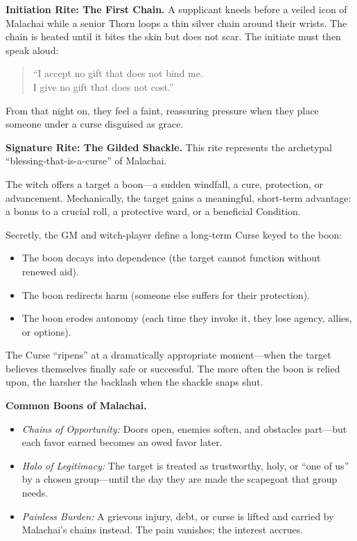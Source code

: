 \documentclass[11pt]{book}
\begin{document}
\medskip

\textbf{Initiation Rite: The First Chain.}
A supplicant kneels before a veiled icon of Malachai while a senior Thorn loops a thin silver chain around their wrists. The chain is heated until it bites the skin but does not scar. The initiate must then speak aloud:
\begin{quote}
  ``I accept no gift that does not bind me.\\
  I give no gift that does not cost.'' 
\end{quote}
From that night on, they feel a faint, reassuring pressure when they place someone under a curse disguised as grace.

\medskip

\textbf{Signature Rite: The Gilded Shackle.}
This rite represents the archetypal ``blessing-that-is-a-curse'' of Malachai.

\begin{description}[leftmargin=*,style=nextline]
  \item[Effect:] The witch offers a target a boon---a sudden windfall, a cure, protection, or advancement. Mechanically, the target gains a meaningful, short-term advantage: a bonus to a crucial roll, a protective ward, or a beneficial Condition.
  \item[Hidden Cost:] Secretly, the GM and witch-player define a long-term Curse keyed to the boon:
    \begin{itemize}
      \item The boon decays into dependence (the target cannot function without renewed aid).
      \item The boon redirects harm (someone else suffers for their protection).
      \item The boon erodes autonomy (each time they invoke it, they lose agency, allies, or options).
    \end{itemize}
  \item[Trigger:] The Curse ``ripens'' at a dramatically appropriate moment---when the target believes themselves finally safe or successful. The more often the boon is relied upon, the harsher the backlash when the shackle snaps shut.
\end{description}

\medskip

\textbf{Common Boons of Malachai.}
\begin{itemize}[leftmargin=*]
  \item \textit{Chains of Opportunity:} Doors open, enemies soften, and obstacles part---but each favor earned becomes an owed favor later.
  \item \textit{Halo of Legitimacy:} The target is treated as trustworthy, holy, or ``one of us'' by a chosen group---until the day they are made the scapegoat that group needs.
  \item \textit{Painless Burden:} A grievous injury, debt, or curse is lifted and carried by Malachai's chains instead. The pain vanishes; the interest accrues.
\end{itemize}
\end{document}
